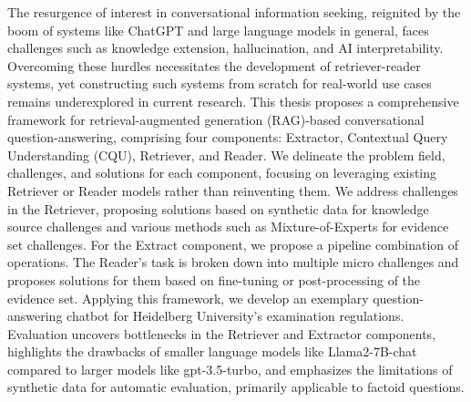 The resurgence of interest in conversational information seeking, reignited by the boom of systems like ChatGPT and large language models in general, faces challenges such as knowledge extension, hallucination, and AI interpretability. Overcoming these hurdles necessitates the development of retriever-reader systems, yet constructing such systems from scratch for real-world use cases remains underexplored in current research. This thesis proposes a comprehensive framework for retrieval-augmented generation (RAG)-based conversational question-answering, comprising four components: Extractor, Contextual Query Understanding (CQU), Retriever, and Reader. We delineate the problem field, challenges, and solutions for each component, focusing on leveraging existing Retriever or Reader models rather than reinventing them. We address challenges in the Retriever, proposing solutions based on synthetic data for knowledge source challenges and various methods such as Mixture-of-Experts for evidence set challenges. For the Extract component, we propose a pipeline combination of operations. The Reader's task is broken down into multiple micro challenges and proposes solutions for them based on fine-tuning or post-processing of the evidence set. Applying this framework, we develop an exemplary question-answering chatbot for Heidelberg University's examination regulations. Evaluation uncovers bottlenecks in the Retriever and Extractor components, highlights the drawbacks of smaller language models like Llama2-7B-chat compared to larger models like gpt-3.5-turbo, and emphasizes the limitations of synthetic data for automatic evaluation, primarily applicable to factoid questions. 